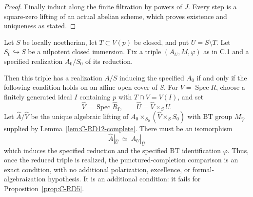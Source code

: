 \begin{proof}
Finally induct along the finite filtration by powers of $J$.
Every step is a square-zero lifting of an actual abelian scheme,
which proves existence and uniqueness as stated.
\end{proof}

\begin{theorem}
\label{thm:C-RD12}
Let $S$ be locally noetherian, let $T\subset V(p)$ be closed, and put
$U=S\setminus T$. Let $S_0\hookrightarrow S$ be a nilpotent closed
immersion. Fix a triple $(A_U,M,\varphi)$ as in C.1 and a specified
realization $A_0/S_0$ of its reduction.

Then this triple has a realization $A/S$ inducing the specified
$A_0$ if and only if the following condition holds on an affine open
cover of $S$. For $V=\operatorname{Spec}R$, choose a finitely generated
ideal $I$ containing $p$ with $T\cap V=V(I)$, and set
\[
 \widehat V=\operatorname{Spec}\widehat R_I,
 \qquad \widehat U=\widehat V\times_S U.
\]
Let $\widehat A/\widehat V$ be the unique algebraic lifting of
$A_0\times_{S_0}(\widehat V\times_SS_0)$ with BT group
$M_{\widehat V}$ supplied by Lemma~\ref{lem:C-RD12-complete}.
There must be an isomorphism
\[
 \widehat A|_{\widehat U}\ \simeq\ A_U|_{\widehat U}
                                                        \tag{C-RD12.1}
\]
which induces the specified reduction and the specified BT
identification $\varphi$. Thus, once the reduced triple is realized,
the punctured-completion comparison is an exact condition, with no
additional polarization, excellence, or formal-algebraization
hypothesis. It is an additional condition: it fails for
Proposition~\ref{prop:C-RD5}.
\end{theorem}
